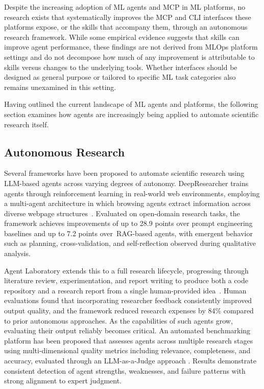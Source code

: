 \documentclass[
english,                 %
bibtex,                  %
includeExtraAbstracts, %
]{kththesis}
\numberwithin{listing}{chapter}
\begin{document}
Despite the increasing adoption of \gls{ML} agents and \gls{MCP} in \gls{ML} platforms, no research exists that systematically improves the \gls{MCP} and \gls{CLI} interfaces these platforms expose, or the skills that accompany them, through an autonomous research framework. While some empirical evidence suggests that skills can improve agent performance, these findings are not derived from \gls{MLOps} platform settings and do not decompose how much of any improvement is attributable to skills versus changes to the underlying tools. Whether interfaces should be designed as general purpose or tailored to specific \gls{ML} task categories also remains unexamined in this setting.

Having outlined the current landscape of \gls{ML} agents and platforms, the following section examines how agents are increasingly being applied to automate scientific research itself.

\subsection{Autonomous Research}

Several frameworks have been proposed to automate scientific research using \gls{LLM}-based agents across varying degrees of autonomy. DeepResearcher trains agents through reinforcement learning in real-world web environments, employing a multi-agent architecture in which browsing agents extract information across diverse webpage structures~\cite{zheng_deepresearcher_2025}. Evaluated on open-domain research tasks, the framework achieves improvements of up to 28.9 points over prompt engineering baselines and up to 7.2 points over~\gls{RAG}-based agents, with emergent behavior such as planning, cross-validation, and self-reflection observed during qualitative analysis.

Agent Laboratory extends this to a full research lifecycle, progressing through literature review, experimentation, and report writing to produce both a code repository and a research report from a single human-provided idea~\cite{schmidgall_agent_2025}. Human evaluations found that incorporating researcher feedback consistently improved output quality, and the framework reduced research expenses by 84\% compared to prior autonomous approaches. As the capabilities of such agents grow, evaluating their output reliably becomes critical. An automated benchmarking platform has been proposed that assesses agents across multiple research stages using multi-dimensional quality metrics including relevance, completeness, and accuracy, evaluated through an LLM-as-a-Judge approach \cite{mane_ai_2026}. Results demonstrate consistent detection of agent strengths, weaknesses, and failure patterns with strong alignment to expert judgment.
\end{document}
